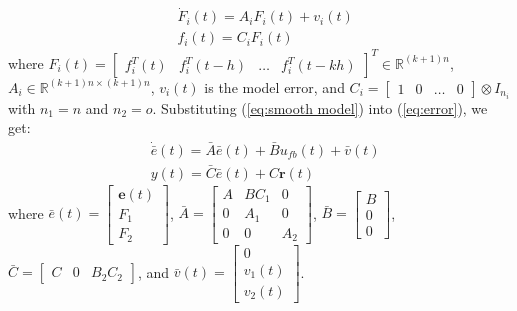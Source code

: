 \documentclass{ieeeaccess}
\newtheorem{remark}{Remark}
\begin{document}
\begin{equation} \label{eq:smooth model}
    \begin{split}
        & \dot{F}_i(t)=A_iF_i(t)+v_i(t) \\
        & f_i(t)=C_iF_i(t)        
    \end{split}
\end{equation}
where $F_i(t)=\begin{bmatrix}
    f_i^T(t) & f_i^T(t-h) & \dots & f_i^T(t-kh)
\end{bmatrix}^T\in\mathbb{R}^{(k+1)n}$, $A_i\in\mathbb{R}^{{(k+1)n}\times{(k+1)n}}$, $v_i(t)$ is the model error, and $C_i=\begin{bmatrix}
        1 & 0 & \dots & 0
    \end{bmatrix}\otimes I_{n_i}$ with $n_1=n$ and $n_2 = o$. Substituting (\ref{eq:smooth model}) into (\ref{eq:error}), we get:
\begin{equation} \label{eq:e_bar}
    \begin{split}
        & \dot{\bar{e}}(t) = \bar{A}\bar{e}(t)+\bar{B}u_{fb}(t)+\bar{v}(t) \\
        & y(t)=\bar{C}\bar{e}(t) + C\pmb{r}(t)
    \end{split}
\end{equation}
where $\bar{e}(t) = \begin{bmatrix}
    \pmb{e}(t) \\ F_1 \\ F_2
\end{bmatrix}$, $\bar{A}=\begin{bmatrix}
    A & BC_1 & 0 \\
    0 & A_1 & 0 \\
    0 & 0 & A_2
\end{bmatrix}$, $\bar{B}=\begin{bmatrix}
    B \\ 0 \\ 0
\end{bmatrix}$, $\bar{C}=\begin{bmatrix}
    C & 0 & B_2C_2
\end{bmatrix}$, and $\bar{v}(t)=\begin{bmatrix}
    0 \\ v_1(t) \\ v_2(t)
\end{bmatrix}$.
\end{document}
